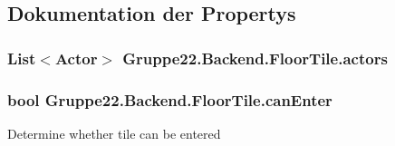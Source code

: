 \subsection{Dokumentation der Propertys}
\hypertarget{class_gruppe22_1_1_backend_1_1_floor_tile_a7e345b719614f87d9473c10afe55cb61}{
\subsubsection[{actors}]{\setlength{\rightskip}{0pt plus 5cm}List$<${\bf Actor}$>$ Gruppe22.\-Backend.\-Floor\-Tile.\-actors\hspace{0.3cm}{\ttfamily [get]}}}\label{class_gruppe22_1_1_backend_1_1_floor_tile_a7e345b719614f87d9473c10afe55cb61}
\hypertarget{class_gruppe22_1_1_backend_1_1_floor_tile_a07516e27f9669dd9e852cf42a1a94635}{
\subsubsection[{can\-Enter}]{\setlength{\rightskip}{0pt plus 5cm}bool Gruppe22.\-Backend.\-Floor\-Tile.\-can\-Enter\hspace{0.3cm}{\ttfamily [get]}}}\label{class_gruppe22_1_1_backend_1_1_floor_tile_a07516e27f9669dd9e852cf42a1a94635}


Determine whether tile can be entered 

